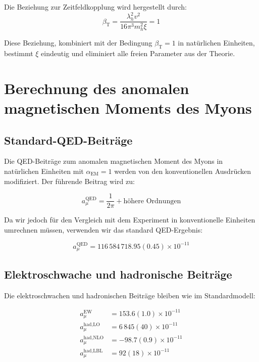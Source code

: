 \documentclass[12pt,a4paper]{article}
\newcommand{\alphaEM}{\alpha_{\text{EM}}}
\newcommand{\betaT}{\beta_{\text{T}}}
\newcommand{\xipar}{\xi}
\begin{document}
	Die Beziehung zur Zeitfeldkopplung wird hergestellt durch:
	\begin{equation}
		\betaT = \frac{\lambda_h^2 v^2}{16\pi^3 m_h^2 \xipar} = 1
		\label{eq:beta_t_relationship}
	\end{equation}
	
	Diese Beziehung, kombiniert mit der Bedingung $\betaT = 1$ in natürlichen Einheiten, bestimmt $\xipar$ eindeutig und eliminiert alle freien Parameter aus der Theorie.
	
	\section{Berechnung des anomalen magnetischen Moments des Myons}
	
	\subsection{Standard-QED-Beiträge}
	
	Die QED-Beiträge zum anomalen magnetischen Moment des Myons in natürlichen Einheiten mit $\alphaEM = 1$ werden von den konventionellen Ausdrücken modifiziert. Der führende Beitrag wird zu:
	
	\begin{equation}
		a_\mu^{\text{QED}} = \frac{1}{2\pi} + \text{höhere Ordnungen}
	\end{equation}
	
	Da wir jedoch für den Vergleich mit dem Experiment in konventionelle Einheiten umrechnen müssen, verwenden wir das standard QED-Ergebnis:
	
	\begin{equation}
		a_\mu^{\text{QED}} = 116\,584\,718.95(0.45) \times 10^{-11}
	\end{equation}
	
	\subsection{Elektroschwache und hadronische Beiträge}
	
	Die elektroschwachen und hadronischen Beiträge bleiben wie im Standardmodell:
	
	\begin{align}
		a_\mu^{\text{EW}} &= 153.6(1.0) \times 10^{-11}\\
		a_\mu^{\text{had,LO}} &= 6\,845(40) \times 10^{-11}\\
		a_\mu^{\text{had,NLO}} &= -98.7(0.9) \times 10^{-11}\\
		a_\mu^{\text{had,LBL}} &= 92(18) \times 10^{-11}
	\end{align}
	
\end{document}
